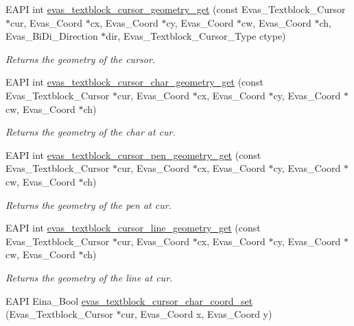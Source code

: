 \begin{DoxyCompactItemize}
EAPI int \hyperlink{group__Evas__Object__Textblock_ga53de4d5aa108014959e6eef6cc09e463}{evas\_\-textblock\_\-cursor\_\-geometry\_\-get} (const Evas\_\-Textblock\_\-Cursor $\ast$cur, Evas\_\-Coord $\ast$cx, Evas\_\-Coord $\ast$cy, Evas\_\-Coord $\ast$cw, Evas\_\-Coord $\ast$ch, Evas\_\-BiDi\_\-Direction $\ast$dir, Evas\_\-Textblock\_\-Cursor\_\-Type ctype)
\begin{DoxyCompactList}\small\item\em Returns the geometry of the cursor. \item\end{DoxyCompactList}\item 
EAPI int \hyperlink{group__Evas__Object__Textblock_ga47950e666e252bbf0ad9d46b59e74269}{evas\_\-textblock\_\-cursor\_\-char\_\-geometry\_\-get} (const Evas\_\-Textblock\_\-Cursor $\ast$cur, Evas\_\-Coord $\ast$cx, Evas\_\-Coord $\ast$cy, Evas\_\-Coord $\ast$cw, Evas\_\-Coord $\ast$ch)
\begin{DoxyCompactList}\small\item\em Returns the geometry of the char at cur. \item\end{DoxyCompactList}\item 
EAPI int \hyperlink{group__Evas__Object__Textblock_ga07130c3e5323cc4aab5740e926221105}{evas\_\-textblock\_\-cursor\_\-pen\_\-geometry\_\-get} (const Evas\_\-Textblock\_\-Cursor $\ast$cur, Evas\_\-Coord $\ast$cx, Evas\_\-Coord $\ast$cy, Evas\_\-Coord $\ast$cw, Evas\_\-Coord $\ast$ch)
\begin{DoxyCompactList}\small\item\em Returns the geometry of the pen at cur. \item\end{DoxyCompactList}\item 
EAPI int \hyperlink{group__Evas__Object__Textblock_gaa49a0235809d49fb5f988253050dd101}{evas\_\-textblock\_\-cursor\_\-line\_\-geometry\_\-get} (const Evas\_\-Textblock\_\-Cursor $\ast$cur, Evas\_\-Coord $\ast$cx, Evas\_\-Coord $\ast$cy, Evas\_\-Coord $\ast$cw, Evas\_\-Coord $\ast$ch)
\begin{DoxyCompactList}\small\item\em Returns the geometry of the line at cur. \item\end{DoxyCompactList}\item 
EAPI Eina\_\-Bool \hyperlink{group__Evas__Object__Textblock_ga216d7d74aae2d58f0cc42bf1a0291b00}{evas\_\-textblock\_\-cursor\_\-char\_\-coord\_\-set} (Evas\_\-Textblock\_\-Cursor $\ast$cur, Evas\_\-Coord x, Evas\_\-Coord y)

\end{DoxyCompactItemize}
